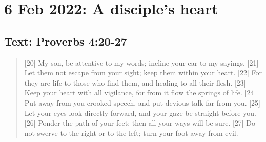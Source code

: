 \section{6 Feb 2022: A disciple's heart}
\subsection*{Text: Proverbs 4:20-27}
\begin{quote}
    [20] My son, be attentive to my words;
        incline your ear to my sayings.
    [21] Let them not escape from your sight;
        keep them within your heart.
    [22] For they are life to those who find them,
        and healing to all their flesh.
    [23] Keep your heart with all vigilance,
        for from it flow the springs of life.
    [24] Put away from you crooked speech,
        and put devious talk far from you.
    [25] Let your eyes look directly forward,
        and your gaze be straight before you.
    [26] Ponder the path of your feet;
        then all your ways will be sure.
    [27] Do not swerve to the right or to the left;
        turn your foot away from evil.
\end{quote}
